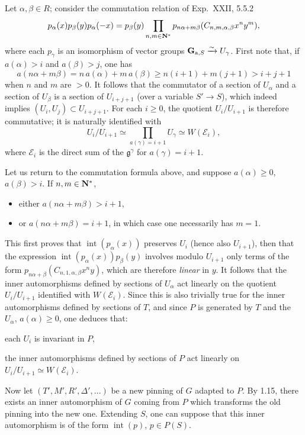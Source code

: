 Let $\alpha,\beta\in R$; consider the commutation relation of Exp.~XXII, 5.5.2
\[
p_\alpha(x)p_\beta(y)p_\alpha(-x)=p_\beta(y)\prod_{n,m\in\mathbf{N}^*}p_{n\alpha+m\beta}(C_{n,m,\alpha,\beta}x^ny^m),
\]
where each $p_\gamma$ is an isomorphism of vector groups $\mathbf G_{\mathrm a,S}\xrightarrow{\sim} U_\gamma$. First note that, if $a(\alpha)>i$ and $a(\beta)>j$, one has
\[
a(n\alpha+m\beta)=n\,a(\alpha)+m\,a(\beta)\ge n(i+1)+m(j+1)>i+j+1
\]
when $n$ and $m$ are $>0$. It follows that the commutator of a section of $U_\alpha$ and a section of $U_\beta$ is a section of $U_{i+j+1}$ (over a variable $S'\to S$), which indeed implies $(U_i,U_j)\subset U_{i+j+1}$. For each $i\ge0$, the quotient $U_i/U_{i+1}$ is therefore commutative; it is naturally identified with
\[
U_i/U_{i+1}\simeq\prod_{a(\gamma)=i+1}U_\gamma\simeq W(\mathcal E_i),
\]
where $\mathcal E_i$ is the direct sum of the $\mathfrak g^\gamma$ for $a(\gamma)=i+1$.

Let us return to the commutation formula above, and suppose $a(\alpha)\ge0$, $a(\beta)>i$. If $n,m\in\mathbf{N}^*$,
\begin{itemize}
\item either $a(n\alpha+m\beta)>i+1$,
\item or $a(n\alpha+m\beta)=i+1$, in which case one necessarily has $m=1$.
\end{itemize}
This first proves that $\operatorname{int}(p_\alpha(x))$ preserves $U_i$ (hence also $U_{i+1}$), then that the expression $\operatorname{int}(p_\alpha(x))p_\beta(y)$ involves modulo $U_{i+1}$ only terms of the form $p_{n\alpha+\beta}(C_{n,1,\alpha,\beta}x^ny)$, which are therefore \emph{linear} in $y$. It follows that the inner automorphisms defined by sections of $U_\alpha$ act linearly on the quotient $U_i/U_{i+1}$ identified with $W(\mathcal E_i)$. Since this is also trivially true for the inner automorphisms defined by sections of $T$, and since $P$ is generated by $T$ and the $U_\alpha$, $a(\alpha)\ge0$, one deduces that:
\begin{enumeratei}
\item each $U_i$ is invariant in $P$,
\item the inner automorphisms defined by sections of $P$ act linearly on $U_i/U_{i+1}\simeq W(\mathcal E_i)$.
\end{enumeratei}

\label{XXVI.2.1.2}
Now let $(T',M',R',\Delta',\ldots)$ be a new pinning of $G$ adapted to $P$. By 1.15, there exists an inner automorphism of $G$ coming from $P$ which transforms the old pinning into the new one. Extending $S$, one can suppose that this inner automorphism is of the form $\operatorname{int}(p)$, $p\in P(S)$.

